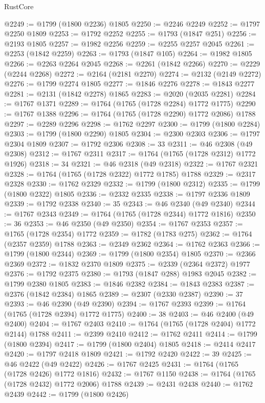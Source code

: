 \begin{lexlean}{RustCore}
\begin{coremodule}
@2249 := @1799 (@1800 @2236) @1805
@2250 := @2246 @2249
@2252 := @1797 @2250 @1809
@2253 := @1792 @2252
@2255 := @1793 (@1847 @251)
@2256 := @2193 @1805
@2257 := @1982 @2256
@2259 := @2255 @2257 @2045
@2261 := @2253 (@1842 @2259)
@2263 := @1793 (@1847 @105)
@2264 := @1982 @1805
@2266 := @2263 @2264 @2045
@2268 := @2261 (@1842 @2266)
@2270 := @2229 (@2244 @2268)
@2272 := @2164 (@2181 @2270)
@2274 := @2132 (@2149 @2272)
@2276 := @1799 @2274 @1805
@2277 := @1846 @2276
@2278 := @1843 @2277
@2281 := @2131 (@1842 @2278) @1865
@2283 := @2020 (@2035 @2281)
@2284 := @1767 @1371
@2289 := @1764 (@1765 (@1728 @2284) @1772 @1775)
@2290 := @1767 @1388
@2296 := @1764 (@1765 (@1728 @2290) @1772 @2086) @1788
@2297 := @2289 @2296
@2298 := @1762 @2297
@2300 := @1799 (@1800 @2284)
@2303 := @1799 (@1800 @2290) @1805
@2304 := @2300 @2303
@2306 := @1797 @2304 @1809
@2307 := @1792 @2306
@2308 := 33
@2311 := @46 @2308 (@49 @2308)
@2312 := @1767 @2311
@2317 := @1764 (@1765 (@1728 @2312) @1772 @1926)
@2318 := 34
@2321 := @46 @2318 (@49 @2318)
@2322 := @1767 @2321
@2328 := @1764 (@1765 (@1728 @2322) @1772 @1785) @1788
@2329 := @2317 @2328
@2330 := @1762 @2329
@2332 := @1799 (@1800 @2312)
@2335 := @1799 (@1800 @2322) @1805
@2336 := @2332 @2335
@2338 := @1797 @2336 @1809
@2339 := @1792 @2338
@2340 := 35
@2343 := @46 @2340 (@49 @2340)
@2344 := @1767 @2343
@2349 := @1764 (@1765 (@1728 @2344) @1772 @1816)
@2350 := 36
@2353 := @46 @2350 (@49 @2350)
@2354 := @1767 @2353
@2357 := @1765 (@1728 @2354) @1772
@2359 := @1782 (@1783 @275)
@2362 := @1764 (@2357 @2359) @1788
@2363 := @2349 @2362
@2364 := @1762 @2363
@2366 := @1799 (@1800 @2344)
@2369 := @1799 (@1800 @2354) @1805
@2370 := @2366 @2369
@2372 := @1832 @2370 @1809
@2375 := @2339 (@2364 @2372) @1977
@2376 := @1792 @2375
@2380 := @1793 (@1847 @288) @1983 @2045
@2382 := @1799 @2380 @1805
@2383 := @1846 @2382
@2384 := @1843 @2383
@2387 := @2376 (@1842 @2384) @1865
@2389 := @2307 (@2330 @2387)
@2390 := 37
@2393 := @46 @2390 (@49 @2390)
@2394 := @1767 @2393
@2399 := @1764 (@1765 (@1728 @2394) @1772 @1775)
@2400 := 38
@2403 := @46 @2400 (@49 @2400)
@2404 := @1767 @2403
@2410 := @1764 (@1765 (@1728 @2404) @1772 @2144) @1788
@2411 := @2399 @2410
@2412 := @1762 @2411
@2414 := @1799 (@1800 @2394)
@2417 := @1799 (@1800 @2404) @1805
@2418 := @2414 @2417
@2420 := @1797 @2418 @1809
@2421 := @1792 @2420
@2422 := 39
@2425 := @46 @2422 (@49 @2422)
@2426 := @1767 @2425
@2431 := @1764 (@1765 (@1728 @2426) @1772 @1816)
@2432 := @1767 @1150
@2438 := @1764 (@1765 (@1728 @2432) @1772 @2006) @1788
@2439 := @2431 @2438
@2440 := @1762 @2439
@2442 := @1799 (@1800 @2426)

\end{coremodule}
\end{lexlean}
